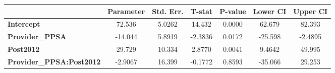 \begin{center}
\begin{tabular}{lclc}
\bottomrule
\end{tabular}
\begin{tabular}{lcccccc}
                                 & \textbf{Parameter} & \textbf{Std. Err.} & \textbf{T-stat} & \textbf{P-value} & \textbf{Lower CI} & \textbf{Upper CI}  \\
\midrule
\textbf{Intercept}               &       72.536       &       5.0262       &      14.432     &      0.0000      &       62.679      &       82.393       \\
\textbf{Provider\_PPSA}          &      -14.044       &       5.8919       &     -2.3836     &      0.0172      &      -25.598      &      -2.4895       \\
\textbf{Post2012}                &       29.729       &       10.334       &      2.8770     &      0.0041      &       9.4642      &       49.995       \\
\textbf{Provider\_PPSA:Post2012} &      -2.9067       &       16.399       &     -0.1772     &      0.8593      &      -35.066      &       29.253       \\
\bottomrule
\end{tabular}
\end{center}